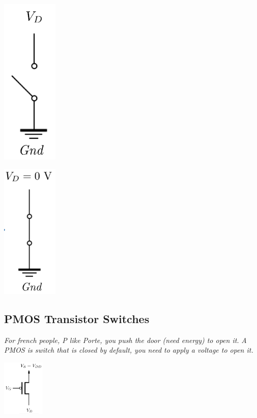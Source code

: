 \documentclass[12pt,openany]{book}
\begin{document}
						\begin{minipage}{0.45\textwidth}	
							\begin{center}
								\includegraphics[width=0.2\textwidth]{circuits/9.1.1_3.png}
							\end{center} %
							      	
							\begin{center}
								\includegraphics[width=0.2\textwidth]{circuits/9.1.1_2.png} %
							\end{center}	      			
		
\end{minipage}
			      		    
			    
\newpage

			      	\subsection{PMOS Transistor Switches}
			      	\textit{For french people, P like Porte, you push the door (need energy) to open it.}
			      	\newline \textit{A PMOS is switch that is closed by default, you need to apply a voltage to open it.}			      	
			      	\begin{center}
			      			\includegraphics[width=0.15\textwidth]{circuits/9.1.2.png} 
			      	\end{center}
\end{document}

